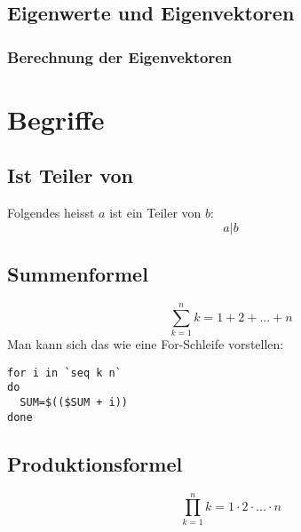 \subsection{Eigenwerte und Eigenvektoren}
\subsubsection{Berechnung der Eigenvektoren}

\section{Begriffe}
\subsection{Ist Teiler von}
Folgendes heisst $a$ ist ein Teiler von $b$:
\[ a | b\]
\subsection{Summenformel}
\[\sum \limits_{k=1}^n k = 1 + 2 + ... + n \]
Man kann sich das wie eine For-Schleife vorstellen:
\begin{verbatim}
for i in `seq k n`
do
  SUM=$(($SUM + i))
done
\end{verbatim}
\subsection{Produktionsformel}
\[\prod \limits_{k=1}^{n}k = 1\cdot 2\cdot ... \cdot n \]



